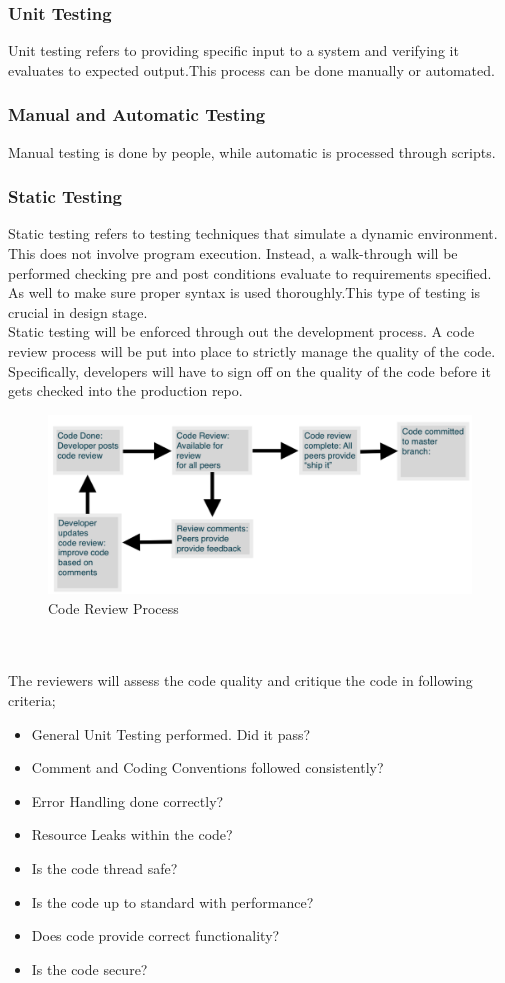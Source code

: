 \documentclass[12pt]{article}
\begin{document}
\subsubsection{Unit Testing}
Unit testing refers to providing specific input to a system and verifying it evaluates to expected output.This process can be done manually or automated.

\subsubsection{Manual and Automatic Testing}
Manual testing is done by people, while automatic is processed through scripts. 

\subsubsection{Static Testing}
Static testing refers to testing techniques that simulate a dynamic environment. This does not involve program execution. Instead, a walk-through
will be performed checking pre and post conditions evaluate to requirements specified. As well to make sure proper syntax is used thoroughly.This type of testing is crucial in design stage. \\
Static testing will be enforced through out the development process. A code review process will be put into place to strictly manage the quality of the code. Specifically, developers will have to sign off on the quality of the code before it gets checked into the production repo.
\begin{figure}[!htb]
\includegraphics[width=\textwidth,height=\textheight,keepaspectratio]{review_process.png}
\caption{Code Review Process}
\label{fig:CodeReview}
\end{figure}
\\\\
The reviewers will assess the code quality and critique the code in following criteria;\\
\begin{itemize}
 \item General Unit Testing performed. Did it pass?
 \item Comment and Coding Conventions followed consistently?
 \item Error Handling done correctly?
 \item Resource Leaks within the code?
 \item Is the code thread safe?
 \item Is the code up to standard with performance?
 \item Does code provide correct functionality?
 \item Is the code secure?
 \end{itemize}
\end{document}
